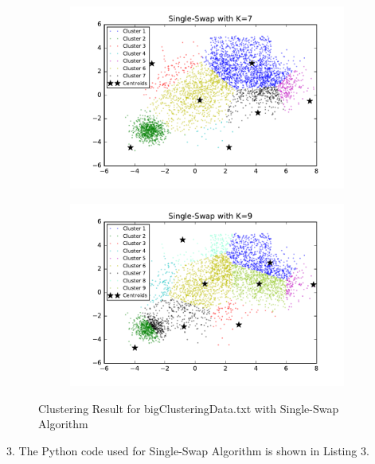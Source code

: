 \begin{description}
\begin{description}
\begin{figure}[!h]
\begin{subfigure}[b]{0.475\textwidth}
        \end{subfigure}
        \begin{subfigure}[b]{0.475\textwidth}   
            \centering 
            \includegraphics[width=\textwidth]{./figures/bigClustering_singleSwap_7.pdf}
        \end{subfigure}
        \hfill
        \begin{subfigure}[b]{0.475\textwidth}   
            \centering 
            \includegraphics[width=\textwidth]{./figures/bigClustering_singleSwap_9.pdf}
        \end{subfigure}
        
        \caption{Clustering Result for bigClusteringData.txt with Single-Swap Algorithm}
        \label{fig:single-swap-bigClustering}
\end{figure}


\newpage
\item{3.} The Python code used for Single-Swap Algorithm is shown in Listing 3.


\end{description}
\end{description}
